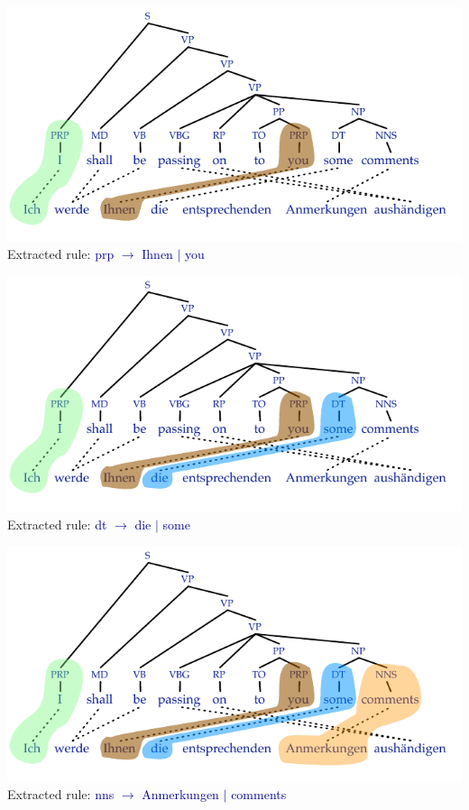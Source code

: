 \documentclass[landscape]{slides}
\newcommand{\example}[1]{\textcolor{darkblue}{\rm #1}}
\begin{document}
\vspace{5mm}
\begin{center}
\includegraphics[scale=2.1]{minimal-rules2.pdf}\\
Extracted rule: \example{{\sc prp} $\rightarrow$ Ihnen $|$ you}
\end{center}


\vspace{5mm}
\begin{center}
\includegraphics[scale=2.1]{minimal-rules3.pdf}\\[-1mm]
Extracted rule: \example{{\sc dt} $\rightarrow$ die $|$ some}
\end{center}


\vspace{5mm}
\begin{center}
\includegraphics[scale=2.1]{minimal-rules4.pdf}\\[-1mm]
Extracted rule: \example{{\sc nns} $\rightarrow$ Anmerkungen $|$ comments}
\end{center}
\end{document}
